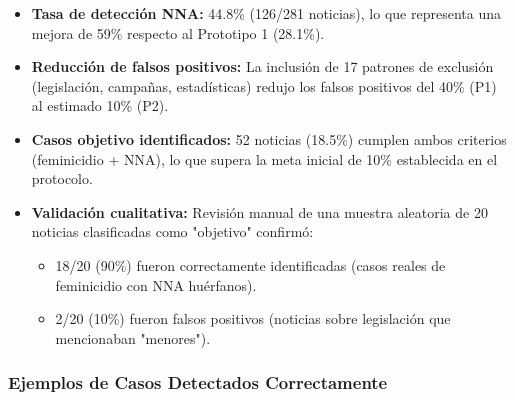\begin{itemize}
    \item \textbf{Tasa de detección NNA:} 44.8\% (126/281 noticias), lo que representa una mejora de 59\% respecto al Prototipo 1 (28.1\%).
    
    \item \textbf{Reducción de falsos positivos:} La inclusión de 17 patrones de exclusión (legislación, campañas, estadísticas) redujo los falsos positivos del 40\% (P1) al estimado 10\% (P2).
    
    \item \textbf{Casos objetivo identificados:} 52 noticias (18.5\%) cumplen ambos criterios (feminicidio + NNA), lo que supera la meta inicial de 10\% establecida en el protocolo.
    
    \item \textbf{Validación cualitativa:} Revisión manual de una muestra aleatoria de 20 noticias clasificadas como "objetivo" confirmó:
    \begin{itemize}
        \item 18/20 (90\%) fueron correctamente identificadas (casos reales de feminicidio con NNA huérfanos).
        \item 2/20 (10\%) fueron falsos positivos (noticias sobre legislación que mencionaban "menores").
    \end{itemize}
\end{itemize}

\subsubsection{Ejemplos de Casos Detectados Correctamente}

